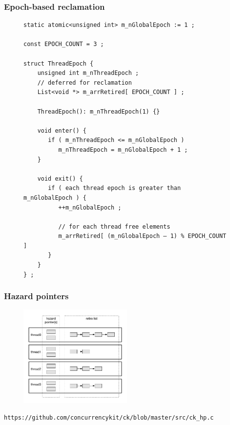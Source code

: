 \documentclass[aspectratio=169, pdf, 8pt, unicode]{beamer}
\begin{document}
\begin{frame}[fragile]
\frametitle{Epoch-based reclamation}
\begin{figure}[H]
\centering
\begin{minipage}{0.8\textwidth}
\small
\begin{verbatim}
static atomic<unsigned int> m_nGlobalEpoch := 1 ;

const EPOCH_COUNT = 3 ;

struct ThreadEpoch {
    unsigned int m_nThreadEpoch ;
    // deferred for reclamation
    List<void *> m_arrRetired[ EPOCH_COUNT ] ;

    ThreadEpoch(): m_nThreadEpoch(1) {}

    void enter() {
       if ( m_nThreadEpoch <= m_nGlobalEpoch )
          m_nThreadEpoch = m_nGlobalEpoch + 1 ;
    }

    void exit() {
       if ( each thread epoch is greater than m_nGlobalEpoch ) {
          ++m_nGlobalEpoch ;

          // for each thread free elements
          m_arrRetired[ (m_nGlobalEpoch – 1) % EPOCH_COUNT ]
       }
    }
} ;
\end{verbatim}
\end{minipage}%
\end{figure}
\end{frame}

\begin{frame}[fragile]
\frametitle{Hazard pointers}
\begin{figure}
\includegraphics[width=0.5\textwidth]{fig/hp.png}
\end{figure}
\texttt{https://github.com/concurrencykit/ck/blob/master/src/ck\_hp.c}
\end{frame}
\end{document}
